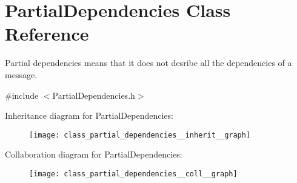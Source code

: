 \hypertarget{class_partial_dependencies}{}\section{Partial\+Dependencies Class Reference}
\label{class_partial_dependencies}


Partial dependencies means that it does not desribe all the dependencies of a message.  




{\ttfamily \#include $<$Partial\+Dependencies.\+h$>$}



Inheritance diagram for Partial\+Dependencies\+:
\nopagebreak
\begin{figure}[H]
\begin{center}
\leavevmode
\texttt{[image: class\_partial\_dependencies\_\_inherit\_\_graph]}
\end{center}
\end{figure}


Collaboration diagram for Partial\+Dependencies\+:
\nopagebreak
\begin{figure}[H]
\begin{center}
\leavevmode
\texttt{[image: class\_partial\_dependencies\_\_coll\_\_graph]}
\end{center}
\end{figure}
